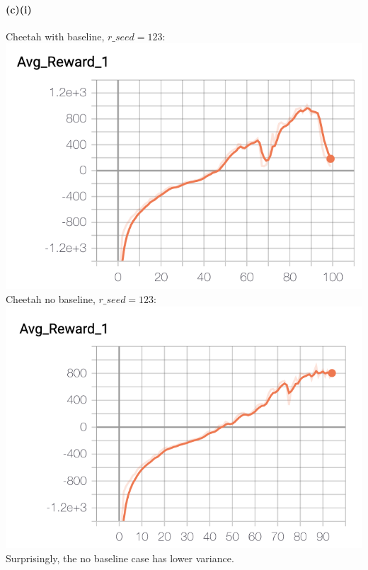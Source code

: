 \documentclass[10pt,a4paper]{article}
\begin{document}
  \paragraph{(c)(i)}  
  Cheetah with baseline, $r\_seed=123$: \\
  \includegraphics[scale=0.5]{images/cheetah_baseline_123_avg_reward.png} \\
  Cheetah no baseline, $r\_seed=123$: \\
  \includegraphics[scale=0.5]{images/cheetah_nobaseline_123_avg_reward.png} \\
  Surprisingly, the no baseline case has lower variance.
\end{document}
